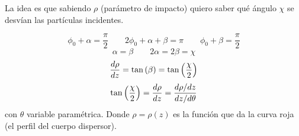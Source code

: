 \documentclass[10pt,oneside]{CBFT_book}
\begin{document}
La idea es que sabiendo $\rho$ (parámetro de impacto) quiero saber qué ángulo $\chi$ se desvían las
partículas incidentes.

\[
	\phi_0 + \alpha = \frac{\pi}{2}		\qquad		2 \phi_0 + \alpha + \beta = \pi
	\qquad \phi_0 + \beta = \frac{\pi}{2}
\]
\[
	\alpha = \beta		\qquad 		2\alpha = 2\beta = \chi
\]
\[
	\frac{d^{\hspace{-0.05em}} {\rho}}{d {z}^{\hspace{-0.05em}}} = \tan \left(\beta \right) = \tan\left(\frac{\chi}{2}\right)
\]
\[
	\tan\left(\frac{\chi}{2}\right) = \frac{d^{\hspace{-0.05em}} {\rho}}{d {z}^{\hspace{-0.05em}}} = \frac{ d\rho/dz }{ dz/d\theta }
\]
con $\theta$ variable paramétrica. Donde $\rho = \rho(z)$ es la función que da la curva roja (el perfil
del cuerpo dispersor).





\end{document}
